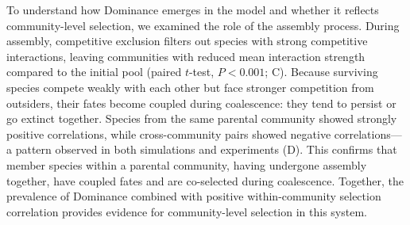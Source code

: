To understand how Dominance emerges in the model and whether it reflects community-level selection, we examined the role of the assembly process. During assembly, competitive exclusion filters out species with strong competitive interactions, leaving communities with reduced mean interaction strength compared to the initial pool (paired $t$-test, $P <0.001$; C). Because surviving species compete weakly with each other but face stronger competition from outsiders, their fates become coupled during coalescence: they tend to persist or go extinct together.  Species from the same parental community showed strongly positive correlations, while cross-community pairs showed negative correlations—a pattern observed in both simulations and experiments (D).  This confirms that member species within a parental community, having undergone assembly together, have coupled fates and are co-selected during coalescence. Together, the prevalence of Dominance combined with positive within-community selection correlation provides evidence for community-level selection in this system.


